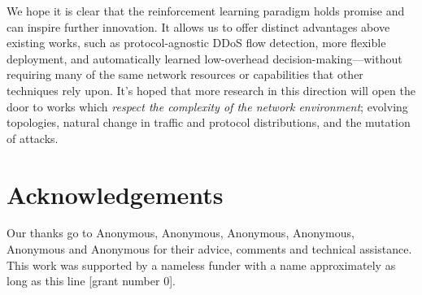 \documentclass[10pt, times, conference, letterpaper]{IEEEtran}
\begin{document}
We hope it is clear that the reinforcement learning paradigm holds promise and can inspire further innovation.
It allows us to offer distinct advantages above existing works, such as protocol-agnostic DDoS flow detection, more flexible deployment, and automatically learned low-overhead decision-making---without requiring many of the same network resources or capabilities that other techniques rely upon.
It's hoped that more research in this direction will open the door to works which \emph{respect the complexity of the network environment}; evolving topologies, natural change in traffic and protocol distributions, and the mutation of attacks.

\section*{Acknowledgements}
Our thanks go to Anonymous, Anonymous, Anonymous, Anonymous, Anonymous and Anonymous for their advice, comments and technical assistance.
This work was supported by a nameless funder with a name approximately as long as this line [grant number 0].

\renewcommand*{\bibfont}{\footnotesize}
\printbibliography
\end{document}
